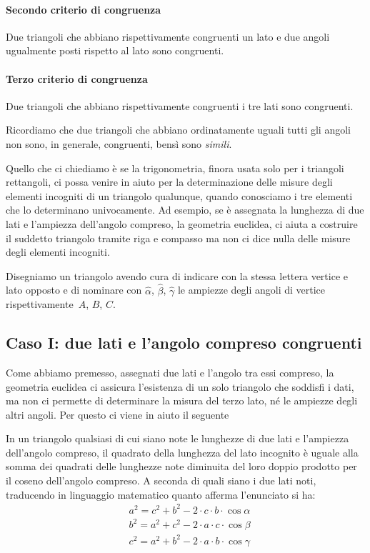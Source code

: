 \paragraph{Secondo criterio di congruenza}
Due triangoli che abbiano rispettivamente congruenti un lato e due
angoli ugualmente posti rispetto al lato sono congruenti.

\paragraph{Terzo criterio di congruenza}
Due triangoli che abbiano rispettivamente congruenti i tre lati sono congruenti.

Ricordiamo che due triangoli che abbiano ordinatamente uguali tutti gli angoli 
non sono, in generale, congruenti, bensì sono \emph{simili}.

Quello che ci chiediamo è se la trigonometria, finora usata solo per i 
triangoli 
rettangoli, ci possa venire in aiuto per la
determinazione delle misure degli elementi incogniti di un triangolo qualunque, 
quando conosciamo i tre elementi che lo
determinano univocamente. Ad esempio, se è assegnata la lunghezza di due lati e 
l'ampiezza dell'angolo compreso,
la geometria euclidea, ci aiuta a costruire il suddetto triangolo tramite riga 
e 
compasso ma non ci dice nulla delle
misure degli elementi incogniti.

Disegniamo un triangolo avendo cura di indicare con la stessa lettera vertice e 
lato opposto e di nominare con
${\hat{\alpha}}$, ${\hat{\beta}}$, ${\hat{\gamma}}$ le ampiezze degli angoli di 
vertice rispettivamente~$A$, $B$, $C$.
\begin{center}
 
\end{center}


\subsection{Caso I: due lati e l'angolo compreso congruenti}

Come abbiamo premesso, assegnati due lati e l'angolo tra essi compreso, la 
geometria euclidea ci assicura l'esistenza
di un solo triangolo che soddisfi i dati, ma non ci permette di determinare la 
misura del terzo lato, né le ampiezze degli altri angoli.
Per questo ci viene in aiuto il seguente

\begin{teorema}
In un triangolo qualsiasi di cui siano note le lunghezze di due lati e 
l'ampiezza dell'angolo compreso, il quadrato della lunghezza
del lato incognito è uguale alla somma dei quadrati delle lunghezze note 
diminuita del loro doppio prodotto per il coseno dell'angolo compreso.
A seconda di quali siano i due lati noti, traducendo in linguaggio matematico 
quanto afferma l'enunciato si ha:
\begin{align*}
&a^{2}=c^{2}+b^{2}-2\cdot c\cdot b\cdot \cos \alpha\\
&b^{2}=a^{2}+c^{2}-2\cdot a\cdot c\cdot \cos  \beta\\
&c^{2}=a^{2}+b^{2}-2\cdot a\cdot b\cdot \cos \gamma
\end{align*}
\end{teorema}


